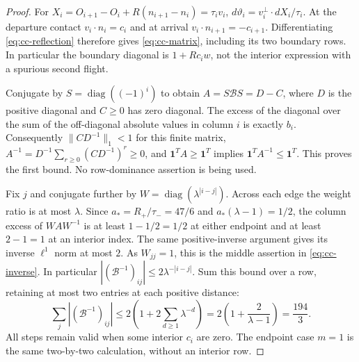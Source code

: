 \begin{proof}
For $X_i=O_{i+1}-O_i+R(n_{i+1}-n_i)=\tau_i v_i$,
$d\vartheta_i=v_i^\perp\cdot dX_i/\tau_i$.
At the departure contact $v_i\cdot n_i=c_i$ and at arrival
$v_i\cdot n_{i+1}=-c_{i+1}$.  Differentiating
\eqref{eq:cc-reflection} therefore gives \eqref{eq:cc-matrix}, including
its two boundary rows.  In particular the boundary diagonal is
$1+Rc_iw$, not the interior expression with a spurious second flight.

Conjugate by $S=\operatorname{diag}((-1)^i)$ to obtain
$A=S\mathcal B S=D-C$, where $D$ is the positive diagonal and
$C\geq0$ has zero diagonal.  The excess of the diagonal over the sum
of the off-diagonal absolute values in column $i$ is exactly $b_i$.
Consequently $\|CD^{-1}\|_1<1$ for this finite matrix,
$A^{-1}=D^{-1}\sum_{r\geq0}(CD^{-1})^r\geq0$, and
$\mathbf1^TA\geq\mathbf1^T$ implies
$\mathbf1^TA^{-1}\leq\mathbf1^T$.  This proves the first bound.
No row-dominance assertion is being used.

Fix $j$ and conjugate further by
$W=\operatorname{diag}(\lambda^{|i-j|})$.  Across each edge the
weight ratio is at most $\lambda$.  Since
$a_*=R_+/\tau_-=47/6$ and $a_*(\lambda-1)=1/2$, the column
excess of $WAW^{-1}$ is at least $1-1/2=1/2$ at either endpoint
and at least $2-1=1$ at an interior index.  The same positive-inverse
argument gives its inverse $\ell^1$ norm at most $2$.  As $W_{jj}=1$,
this is the middle assertion in \eqref{eq:cc-inverse}.  In particular
$|(\mathcal B^{-1})_{ij}|\leq2\lambda^{-|i-j|}$.  Sum this bound
over a row, retaining at most two entries at each positive distance:
\[
 \sum_j|(\mathcal B^{-1})_{ij}|
 \leq2\left(1+2\sum_{d\geq1}\lambda^{-d}\right)
 =2\left(1+\frac2{\lambda-1}\right)=\frac{194}{3}.
\]
All steps remain valid when some interior $c_i$ are zero.  The endpoint
case $m=1$ is the same two-by-two calculation, without an interior row.
\end{proof}

